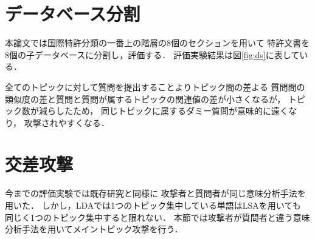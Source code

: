 \documentclass[master]{suribt}
\theoremstyle{definition}
\begin{document}
  
 \section{データベース分割}
 本論文では国際特許分類の一番上の階層の8個のセクションを用いて
 特許文書を8個の子データベースに分割し，評価する．
 評価実験結果は図\ref{fig:ds}に表している．
 
 全てのトピックに対して質問を提出することよりトピック間の差よる
 質問間の類似度の差と質問と質問が属するトピックの関連値の差が小さくなるが，
 トピック数が減らしたため，
 同じトピックに属するダミー質問が意味的に遠くなり，
 攻撃されやすくなる． 　

 \section{交差攻撃}

 今までの評価実験では既存研究と同様に
 攻撃者と質問者が同じ意味分析手法を用いた．
 しかし，LDAでは1つのトピック集中している単語はLSAを用いても
 同じく1つのトピック集中すると限れない．
 本節では攻撃者が質問者と違う意味分析手法を用いてメイントピック攻撃を行う．
\end{document}
